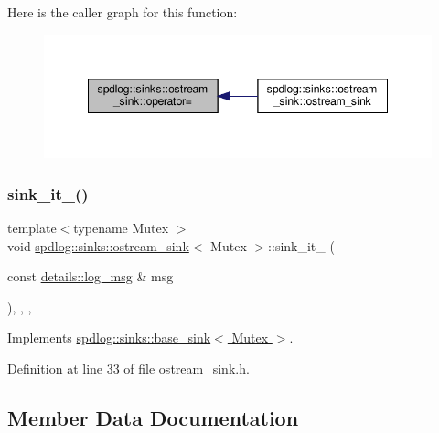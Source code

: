 Here is the caller graph for this function\+:
\nopagebreak
\begin{figure}[H]
\begin{center}
\leavevmode
\includegraphics[width=348pt]{classspdlog_1_1sinks_1_1ostream__sink_a727591b2a4ca044848cacccfca4eb3af_icgraph}
\end{center}
\end{figure}
\mbox{\label{classspdlog_1_1sinks_1_1ostream__sink_a77f36cef81daf668ec55a07fa191d1e7}} 
\subsubsection{\texorpdfstring{sink\+\_\+it\+\_\+()}{sink\_it\_()}}
{\footnotesize\ttfamily template$<$typename Mutex $>$ \\
void \hyperlink{classspdlog_1_1sinks_1_1ostream__sink}{spdlog\+::sinks\+::ostream\+\_\+sink}$<$ Mutex $>$\+::sink\+\_\+it\+\_\+ (\begin{DoxyParamCaption}\item[{const \hyperlink{structspdlog_1_1details_1_1log__msg}{details\+::log\+\_\+msg} \&}]{msg }\end{DoxyParamCaption})\hspace{0.3cm}{\ttfamily [inline]}, {\ttfamily [override]}, {\ttfamily [protected]}, {\ttfamily [virtual]}}



Implements \hyperlink{classspdlog_1_1sinks_1_1base__sink_ad698d300cb7f5e58b2aa1b9907cdbd87}{spdlog\+::sinks\+::base\+\_\+sink$<$ Mutex $>$}.



Definition at line 33 of file ostream\+\_\+sink.\+h.



\subsection{Member Data Documentation}
\mbox{\label{classspdlog_1_1sinks_1_1ostream__sink_a5778019dfdf7dc09ea798c490810eaed}} 
